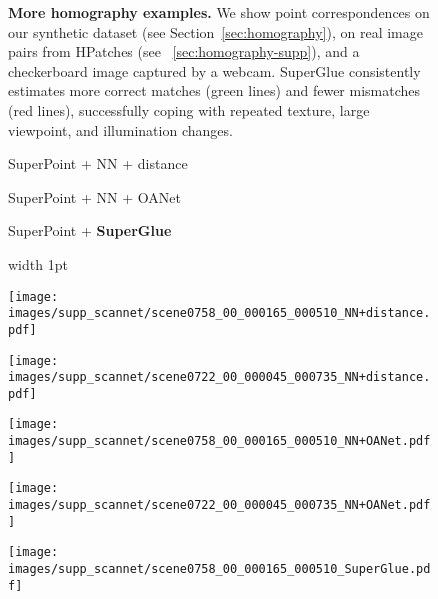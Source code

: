\documentclass[10pt,twocolumn,letterpaper]{article}
\renewcommand{\*}[1]{\mathbf{#1}}
\renewcommand{\b}[1]{\textbf{#1}}
\newcommand{\0}{\phantom{0}}
\begin{document}
\begin{figure*}[ht!]
\vspace{-.1cm}
\caption{{\bf More homography examples.} We show point correspondences on our synthetic dataset (see Section~\ref{sec:homography}), on real image pairs from HPatches (see \supp~\ref{sec:homography-supp}), and a checkerboard image captured by a webcam. SuperGlue consistently estimates more correct matches ({\color{green}green} lines) and fewer mismatches ({\color{red}red} lines), successfully coping with repeated texture, large viewpoint, and illumination changes.}
\label{fig:supp-homography-qualitative}
\end{figure*}

\begin{figure*}[ht!]
\vspace{-2mm}
\centering
\def\iwidth{0.315}
\begin{minipage}{\iwidth\textwidth}
    \centering
    \small{SuperPoint + NN + distance}
\end{minipage}\hspace{1mm}\begin{minipage}{\iwidth\textwidth}
    \centering
    \small{SuperPoint + NN + OANet}
\end{minipage}\hspace{1mm}\begin{minipage}{\iwidth\textwidth}
    \centering
    \small{SuperPoint + \b{SuperGlue}}
\end{minipage}

\begin{minipage}{0.02\textwidth}
\end{minipage}\hfill{\vline width 1pt}\hfill
\hspace{1mm}\begin{minipage}{\iwidth\textwidth}
    \texttt{[image: images/supp\_scannet/scene0758\_00\_000165\_000510\_NN+distance.pdf]}
    
    \vspace{.5mm}
    \texttt{[image: images/supp\_scannet/scene0722\_00\_000045\_000735\_NN+distance.pdf]}
\end{minipage}\hspace{1mm}\begin{minipage}{\iwidth\textwidth}
    \texttt{[image: images/supp\_scannet/scene0758\_00\_000165\_000510\_NN+OANet.pdf]}
    
    \vspace{.5mm}
    \texttt{[image: images/supp\_scannet/scene0722\_00\_000045\_000735\_NN+OANet.pdf]}
\end{minipage}\hspace{1mm}\begin{minipage}{\iwidth\textwidth}
    \texttt{[image: images/supp\_scannet/scene0758\_00\_000165\_000510\_SuperGlue.pdf]}
    

\end{minipage}
\end{figure*}
\end{document}
